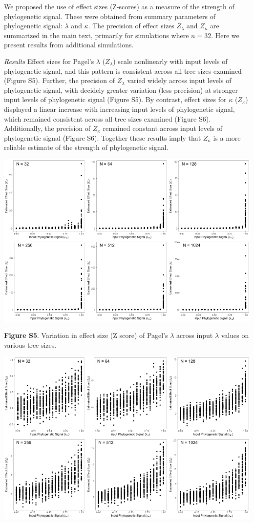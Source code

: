 \documentclass[]{article}
\begin{document}
We proposed the use of effect sizes (Z-scores) as a measure of the
strength of phylogenetic signal. These were obtained from summary
parameters of phylogenetic signal: \(\lambda\) and \(\kappa\). The
precision of effect sizes \(Z_\lambda\) and \(Z_{\kappa}\) are
summarized in the main text, primarily for simulations where \(n=32\).
Here we present results from additional simulations.

\emph{Results} Effect sizes for Pagel's \(\lambda\) (\(Z_\lambda\))
scale nonlinearly with input levels of phylogenetic signal, and this
pattern is consistent across all tree sizes examined (Figure S5).
Further, the precision of \(Z_\lambda\) varied widely across input
levels of phylogenetic signal, with decidely greater variation (less
precision) at stronger input levels of phylogenetic signal (Figure S5).
By contrast, effect sizes for \(\kappa\) (\(Z_{\kappa}\)) displayed a
linear increase with increasing input levels of phylogenetic signal,
which remained consistent across all tree sizes examined (Figure S6).
Additionally, the precision of \(Z_{\kappa}\) remained constant across
input levels of phylogenetic signal (Figure S6). Together these results
imply that \(Z_{\kappa}\) is a more reliable estimate of the strength of
phylogenetic signal.

\includegraphics[width=0.95\linewidth]{FigS5}

\textbf{Figure S5}. Variation in effect size (Z score) of Pagel's
\(\lambda\) across input \(\lambda\) values on various tree sizes.
\hfill\break

\includegraphics[width=0.95\linewidth]{FigS6}
\end{document}
